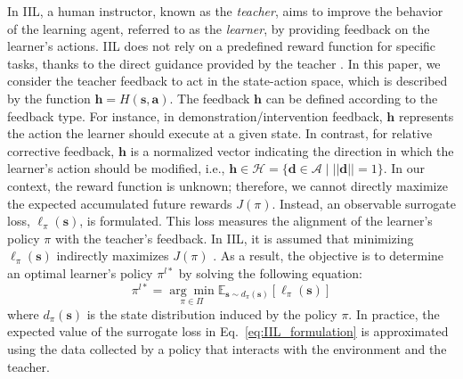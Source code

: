 In IIL, a human instructor, known as the \emph{teacher}, aims to improve the behavior of the learning agent, referred to as the \emph{learner}, by providing feedback on the learner's actions. 
IIL does not rely on a predefined reward function for specific tasks, thanks to the direct guidance provided by the teacher \cite{2022_IIL_survey}.
In this paper, we consider the teacher feedback to act in the state-action space, which is described by the function \( \bm h = {H}(\bm s, \bm a)\).
The feedback $\bm h$ can be defined according to the feedback type.
For instance, in demonstration/intervention feedback, $\bm h$ represents the action the learner should execute at a given state. In contrast, for relative corrective feedback, 
 $\bm h$ is a normalized vector indicating the direction in which
the learner's action should be modified, i.e., 
${\bm h \in \mathcal{H} = \{ \bm d \in \mathcal{A} \mid  ||\bm d|| = 1\}}$.
In our context, the reward function is unknown; therefore, we cannot directly maximize the expected accumulated future rewards $J(\pi)$.
Instead, an observable surrogate loss, \(\ell_{\pi}(\bm{s})\), is formulated. This loss measures the alignment of the learner's policy \(\pi\) with the teacher's feedback. In IIL, it is assumed that minimizing \(\ell_{\pi}(\bm{s})\) indirectly maximizes \(J(\pi)\) \cite{2011_DAgger,2022_IIL_survey}.
As a result, the objective is to determine an optimal learner's policy $\pi^{l*}$ by solving the following equation:
\begin{equation}
    \pi^{l*} = \underset{\pi\in\Pi}{\arg\min} \mathbb{E}_{\bm s\sim d_{\pi}(\bm s)} \left[ \ell_{\pi}( \bm s) \right]
    \label{eq:IIL_formulation}
\end{equation}
where $d_{\pi}(\bm s)$ is the state distribution induced by the policy $\pi$.
In practice, the expected value of the surrogate loss in Eq.~\eqref{eq:IIL_formulation} is approximated using the data collected by a policy that interacts with the environment and the teacher.



